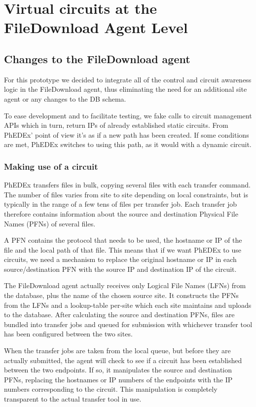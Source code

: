 \section{Virtual circuits at the FileDownload Agent Level}

\subsection{Changes to the FileDownload agent}

For this prototype we decided to integrate all of the control and circuit awareness
logic in the FileDownload agent, thus eliminating the need for an additional site 
agent or any changes to the DB schema. 

To ease development and to facilitate testing, we fake calls to circuit management APIs
which in turn, return IPs of already established static circuits. From PhEDEx'
point of view it's as if a new path has been created. If some conditions are
met, PhEDEx switches to using this path, as it would with a dynamic circuit.

\subsubsection{Making use of a circuit}

PhEDEx transfers files in bulk, copying several files with each transfer command. The number of files varies from
site to site depending on local constraints, but is typically in the range of a few tens of files per transfer job. Each transfer job therefore contains information about the source and destination Physical File Names (PFNs) of several files.

A PFN contains the protocol that needs to be used, the hostname or IP of the file
and the local path of that file. This means that if we want PhEDEx to use
circuits, we need a mechanism to replace the original hostname or IP in each 
source/destination PFN with the source IP and destination IP of the circuit.

The FileDownload agent actually receives only Logical File Names (LFNs) from the database, plus the name of the chosen source site. It constructs the PFNs from the LFNs and a lookup-table per-site which each site maintains and uploads to the database. After calculating the source and destination PFNs, files are bundled into transfer jobs and queued for submission with whichever transfer tool has been configured between the two sites.

When the transfer jobs are taken from the local queue, but before they are actually submitted, the agent will check to see if a circuit has been established between the two endpoints. If so, it manipulates the source and destination PFNs, replacing the hostnames or IP numbers of the endpoints with the IP numbers corresponding to the circuit. This manipulation is completely transparent to the actual transfer tool in use.

